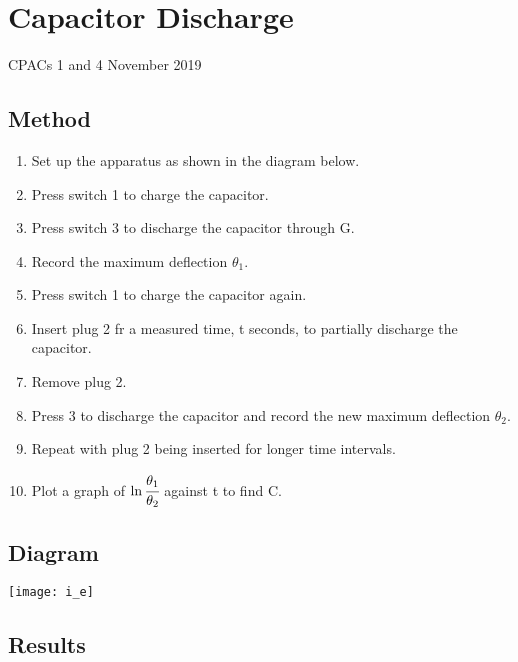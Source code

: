 \section{Capacitor Discharge}
CPACs 1 and 4
\hfill
{} November 2019

\subsection{Method}
\begin{enumerate}
  \item Set up the apparatus as shown in the diagram below.
  \item Press switch 1 to charge the capacitor.
  \item Press switch 3 to discharge the capacitor through G.
  \item Record the maximum deflection $\theta_1$.
  \item Press switch 1 to charge the capacitor again.
  \item Insert plug 2 fr a measured time, t seconds, to partially discharge the capacitor.
  \item Remove plug 2.
  \item Press 3 to discharge the capacitor and record the new maximum deflection $\theta_2$.
  \item Repeat with plug 2 being inserted for longer time intervals.
  \item Plot a graph of $\ln{\cfrac{\theta_1}{\theta_2}}$ against t to find C.
\end{enumerate}

\subsection{Diagram}
\begin{center}
  \texttt{[image: i\_e]}
\end{center}

\subsection{Results}

\begin{center}
\end{center}

